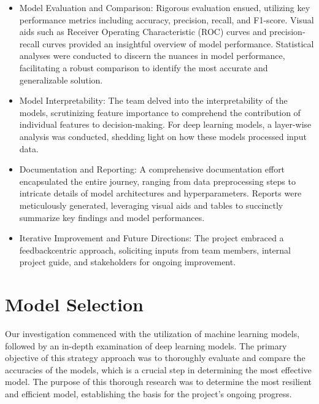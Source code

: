 \documentclass[ 12pt,a4paper,twocolumn,fleqn]{report}
\begin{document}
\begin{itemize}
    \item Model Evaluation and Comparison: Rigorous evaluation ensued, utilizing key
performance metrics including accuracy, precision, recall, and F1-score. Visual aids such as
Receiver Operating Characteristic (ROC) curves and precision-recall curves provided an
insightful overview of model performance. Statistical analyses were conducted to discern the
nuances in model performance, facilitating a robust comparison to identify the most accurate
and generalizable solution.
\item Model Interpretability: The team delved into the interpretability of the models, scrutinizing
feature importance to comprehend the contribution of individual features to decision-making.
For deep learning models, a layer-wise analysis was conducted, shedding light on how these
models processed input data.
\item Documentation and Reporting: A comprehensive documentation effort encapsulated the
entire journey, ranging from data preprocessing steps to intricate details of model architectures
and hyperparameters. Reports were meticulously generated, leveraging visual aids and tables to
succinctly summarize key findings and model performances.
\item Iterative Improvement and Future Directions: The project embraced a feedbackcentric approach, soliciting inputs from team members, internal project guide, and stakeholders
for ongoing improvement.
\end{itemize}
\newpage
  \pagestyle{fancy}
\thisfancypage{%
  \setlength{\fboxsep}{20pt}\doublebox}{}
\normalsize
\section{Model Selection}
\vspace{2mm}
Our investigation commenced with the utilization of machine learning models, followed by an in-depth examination of deep learning models. The primary objective of this strategy approach was to thoroughly evaluate and compare the accuracies of the models, which is a crucial step in determining the most effective model. The purpose of this thorough research was to determine the most resilient and efficient model, establishing the basis for the project's ongoing progress.
\\
\end{document}
